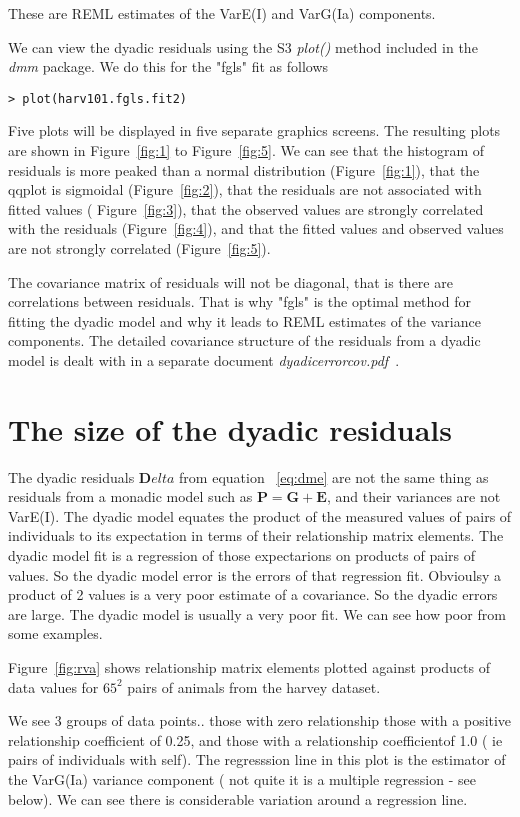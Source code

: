 \documentclass[titlepage,a4paper,12pt]{article}  %
\begin{document}
These are REML estimates of the VarE(I) and VarG(Ia) components.

We can view the dyadic residuals using the S3 {\em plot()} method included in the {\em dmm} package. We do this for the "fgls" fit as follows

\begin{verbatim}
> plot(harv101.fgls.fit2)
\end{verbatim}

Five plots will be displayed in five separate graphics screens.  The resulting plots are shown in Figure~\ref{fig:1}  to Figure~\ref{fig:5}. We can see that the histogram of residuals is more peaked than a normal distribution (Figure~\ref{fig:1}), that the qqplot is sigmoidal (Figure~\ref{fig:2}), that the residuals are not associated with fitted values ( Figure~\ref{fig:3}), that the observed values are strongly correlated with the residuals (Figure~\ref{fig:4}), and that the fitted values and observed values are not strongly correlated (Figure~\ref{fig:5}). 







The covariance matrix of residuals will not be diagonal, that is there are correlations between residuals. That is why "fgls" is the optimal method for fitting the dyadic model and why it leads to REML estimates of the variance components. The detailed covariance structure of the residuals from a dyadic model is dealt with in a separate document {\em dyadicerrorcov.pdf}~\cite{jack:24}. 

\clearpage
\section{The size of the dyadic residuals}
The dyadic residuals ${\bm Delta}$ from equation ~\ref{eq:dme} are not the same thing as residuals from a monadic model such as ${\bm P} = {\bm G} + {\bm E}$, and their variances are not VarE(I).
The dyadic model equates the product of the measured values of pairs of individuals to  its expectation in terms of their relationship matrix elements. The dyadic model fit is a regression of those expectarions on products of pairs of values. So the dyadic model error is the errors of that regression fit. Obvioulsy a product of 2 values is a very poor estimate of a covariance. So the dyadic errors are large. The dyadic model is usually a very poor fit.  We can see how poor from some examples.

Figure~\ref{fig:rva} shows relationship matrix elements plotted against products of data values for $65^{2}$ pairs of animals from the harvey dataset. 

We see 3 groups of data points.. those with zero relationship those with a positive relationship coefficient of 0.25, and those with a relationship coefficientof 1.0 ( ie pairs of individuals with self).
The regresssion line in this plot is the estimator of the VarG(Ia) variance component ( not quite it is a multiple regression - see below). 
We can see there is considerable variation around a regression line.
\end{document}
